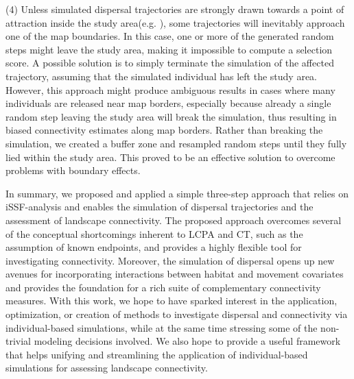 \documentclass[../FinalThesis.tex]{subfiles}
\begin{document}
(4) Unless simulated dispersal trajectories are strongly drawn towards a point
of attraction inside the study area(e.g. \citealp{Signer.2017}), some
trajectories will inevitably approach one of the map boundaries. In this case,
one or more of the generated random steps might leave the study area, making it
impossible to compute a selection score. A possible solution is to simply
terminate the simulation of the affected trajectory, assuming that the simulated
individual has left the study area. However, this approach might produce
ambiguous results in cases where many individuals are released near map borders,
especially because already a single random step leaving the study area will
break the simulation, thus resulting in biased connectivity estimates along map
borders. Rather than breaking the simulation, we created a buffer zone
\citep{Koen.2010} and resampled random steps until they fully lied within the
study area. This proved to be an effective solution to overcome problems with
boundary effects.

In summary, we proposed and applied a simple three-step approach that relies on
iSSF-analysis and enables the simulation of dispersal trajectories and the
assessment of landscape connectivity. The proposed approach overcomes several of
the conceptual shortcomings inherent to LCPA and CT, such as the assumption of
known endpoints, and provides a highly flexible tool for investigating
connectivity. Moreover, the simulation of dispersal opens up new avenues for
incorporating interactions between habitat and movement covariates and provides
the foundation for a rich suite of complementary connectivity measures. With
this work, we hope to have sparked interest in the application, optimization, or
creation of methods to investigate dispersal and connectivity via
individual-based simulations, while at the same time stressing some of the
non-trivial modeling decisions involved. We also hope to provide a useful
framework that helps unifying and streamlining the application of
individual-based simulations for assessing landscape connectivity.
\end{document}
